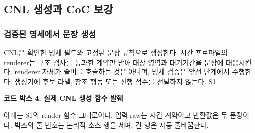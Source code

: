 \documentclass[10pt,a4paper,twocolumn]{article}\usepackage[margin=18mm]{geometry}\usepackage{fontspec,kotex}
\begin{document}
\subsection{CNL 생성과 CoC 보강}

\subsubsection{검증된 명세에서 문장 생성}

CNL은 확인한 명세 필드와 고정된 문장 규칙으로 생성한다. 시간 프로파일의 renderer는 구조 검사를 통과한 계약만 받아 대상 영역과 대기기간을 문장에 대응시킨다. renderer 자체가 솔버를 호출하는 것은 아니며, 명세 검증은 앞선 단계에서 수행한다. 생성기에 후보 라벨, 참조 행동 또는 진행 점수를 전달하지 않는다. \href{\detokenize{projects/04-guardsynth-coc/experiments/paper1_cnl_learning/temporal_preservation.py}}{S1}\par

\textbf{코드 박스 4. 실제 CNL 생성 함수 발췌}\par

아래는 S1의 {\ttfamily{}\selectfont\footnotesize render} 함수 그대로이다. 입력 raw는 시간 계약이고 반환값은 두 문장이다. 박스의 줄 번호는 논리적 소스 행을 세며, 긴 행은 자동 줄바꿈한다.\par
\end{document}
